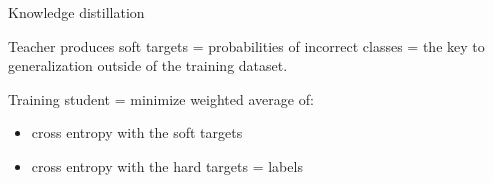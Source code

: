 \documentclass{beamer}
\begin{document}
\begin{frame}{Knowledge distillation}

Teacher produces soft targets = probabilities of incorrect classes = the key to generalization outside of the training dataset.

\vfill

Training student = minimize weighted average of:

\begin{itemize}
\item cross entropy with the soft targets
\item cross entropy with the hard targets = labels
\end{itemize}


\end{frame}
\end{document}
